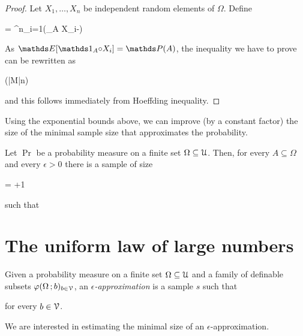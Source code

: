 \documentclass[scombinatorics.tex]{subfiles}
\begin{document}
\begin{proof}
  Let $X_1,\dots,X_n$ be independent random elements of $\Omega$.
  Define
  
  {=}
  {\sum^n_{i=1}\Big({}_A{\circ} X_i-\Big)}

  As $\Ex[{\mathds 1}_A{\circ} X_i]=\Pr(A)$, the inequality we have to prove can be rewritten as 

  {\ge}
  {\Pr \Big(|M|\ge n\epsilon\Big)}

  and this follows immediately from Hoeffding inequality.
  \end{proof}


Using the exponential bounds above, we can improve (by a constant factor) the size of the minimal sample size that approximates the probability.

\begin{corollary}
  Let $\Pr$ be a probability measure on a finite set $\Omega\subseteq\EuScript U$.
  Then, for every $A\subseteq\Omega$ and every $\epsilon>0$ there is a sample of size

      {=}
      {\left\lfloor{}+1\right\rfloor} 
      
  such that

  \QED
\end{corollary}


\section{The uniform law of large numbers}\label{samples}

Given a probability measure on a finite set $\Omega\subseteq \EuScript U$ and a family of definable subsets $\varphi(\Omega\,;b)_{b\in\EuScript V}$, an \emph{$\epsilon$-approximation\/} is a sample $s$ such that

\hfill for every $b\in\EuScript V$.

We are interested in estimating the minimal size of an $\epsilon$-approximation.
\end{document}
